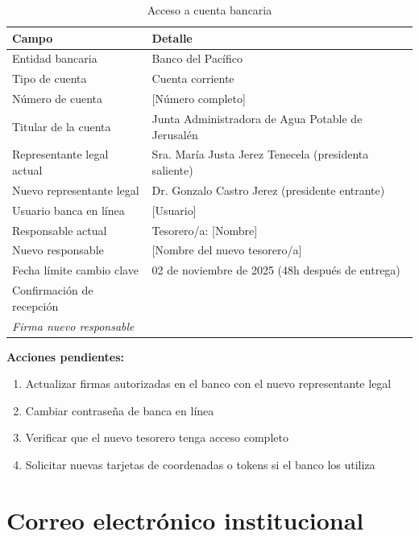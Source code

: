 \begin{table}[H]
\centering
\caption{Acceso a cuenta bancaria}
\label{tab:acceso-banco}
\begin{tabularx}{\textwidth}{@{}lX@{}}
\toprule
\textbf{Campo} & \textbf{Detalle} \\
\midrule
Entidad bancaria & Banco del Pacífico \\
Tipo de cuenta & Cuenta corriente \\
Número de cuenta & [Número completo] \\
Titular de la cuenta & Junta Administradora de Agua Potable de Jerusalén \\
Representante legal actual & Sra. María Justa Jerez Tenecela (presidenta saliente) \\
Nuevo representante legal & Dr. Gonzalo Castro Jerez (presidente entrante) \\
Usuario banca en línea & [Usuario] \\
Responsable actual & Tesorero/a: [Nombre] \\
Nuevo responsable & [Nombre del nuevo tesorero/a] \\
Fecha límite cambio clave & 02 de noviembre de 2025 (48h después de entrega) \\
Confirmación de recepción & \underline{\hspace{5cm}} \\ \emph{Firma nuevo responsable} \\
\bottomrule
\end{tabularx}
\end{table}

\textbf{Acciones pendientes:}
\begin{enumerate}
  \item Actualizar firmas autorizadas en el banco con el nuevo representante legal
  \item Cambiar contraseña de banca en línea
  \item Verificar que el nuevo tesorero tenga acceso completo
  \item Solicitar nuevas tarjetas de coordenadas o tokens si el banco los utiliza
\end{enumerate}

\section{Correo electrónico institucional}

